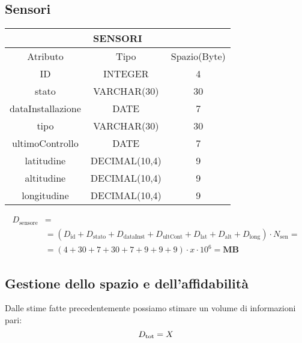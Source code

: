 \subsection{Sensori}
\begin{tabular}{ |c|c|c|}
  \hline
  \multicolumn{3}{|c|}{\textbf{SENSORI}}\\
  \hline
  Atributo & Tipo & Spazio(Byte) \\
  \hline
  ID & INTEGER & 4 \\
  stato & VARCHAR(30) & 30\\
  dataInstallazione & DATE & 7\\
  tipo & VARCHAR(30) & 30\\
  ultimoControllo & DATE & 7\\
  latitudine & DECIMAL(10,4) & 9\\
  altitudine & DECIMAL(10,4) & 9\\
  longitudine & DECIMAL(10,4) & 9\\
  \hline
\end{tabular}
\begin{equation}
  \begin{aligned}
    D_{\text{sensore}} &=\\
    &=(D_{\text{id}}+D_{\text{stato}}+D_{\text{dataInst}}+D_{\text{ultCont}}+D_{\text{lat}}+D_{\text{alt}}+D_{\text{long}})\cdot N_{\text{sen}}=\\
    &=(4+30+7+30+7+9+9+9)\cdot x\cdot 10^6= \textbf{MB}
  \end{aligned}
\end{equation}
\subsection{Gestione dello spazio e dell'affidabilità}
Dalle stime fatte precedentemente possiamo stimare un volume di informazioni pari:
\begin{equation}
  D_{\text{tot}}=X\\
\end{equation}
